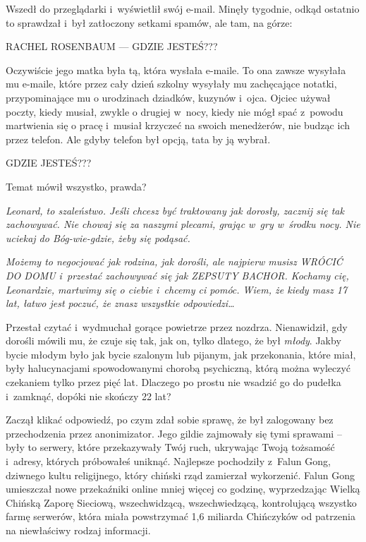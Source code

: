 \documentclass[oneside,polish,11pt,rmheadings]{mwbk}
\begin{document}
Wszedł do przeglądarki i~wyświetlił swój e-mail. Minęły tygodnie, odkąd ostatnio to sprawdzał i~był zatłoczony setkami spamów, ale tam, na górze: 


RACHEL ROSENBAUM --- GDZIE JESTEŚ??? 


Oczywiście jego matka była tą, która wysłała e-maile. To ona zawsze wysyłała mu e-maile, które przez cały dzień szkolny wysyłały mu zachęcające notatki, przypominające mu o urodzinach dziadków, kuzynów i~ojca. Ojciec używał poczty, kiedy musiał, zwykle o drugiej w~nocy, kiedy nie mógł spać z~powodu martwienia się o pracę i~musiał krzyczeć na swoich menedżerów, nie budząc ich przez telefon. Ale gdyby telefon był opcją, tata by ją wybrał. 


GDZIE JESTEŚ??? 


Temat mówił wszystko, prawda? 


\textit{Leonard, to szaleństwo. Jeśli chcesz być traktowany jak dorosły, zacznij się tak zachowywać. Nie chowaj się za naszymi plecami, grając w~gry w~środku nocy. Nie uciekaj do Bóg-wie-gdzie, żeby się podąsać.}


\textit{Możemy to negocjować jak rodzina, jak dorośli, ale najpierw musisz WRÓCIĆ DO DOMU i~przestać zachowywać się jak ZEPSUTY BACHOR. Kochamy cię, Leonardzie, martwimy się o ciebie i~chcemy ci pomóc. Wiem, że kiedy masz 17 lat, łatwo jest poczuć, że znasz wszystkie odpowiedzi\ldots} 


Przestał czytać i~wydmuchał gorące powietrze przez nozdrza. Nienawidził, gdy dorośli mówili mu, że czuje się tak, jak on, tylko dlatego, że był \textit{młody}. Jakby bycie młodym było jak bycie szalonym lub pijanym, jak przekonania, które miał, były halucynacjami spowodowanymi chorobą psychiczną, którą można wyleczyć czekaniem tylko przez pięć lat. Dlaczego po prostu nie wsadzić go do pudełka i~zamknąć, dopóki nie skończy 22 lat? 


Zaczął klikać odpowiedź, po czym zdał sobie sprawę, że był zalogowany bez przechodzenia przez anonimizator. Jego gildie zajmowały się tymi sprawami -- były to serwery, które przekazywały Twój ruch, ukrywając Twoją tożsamość i~adresy, których próbowałeś uniknąć. Najlepsze pochodziły z~Falun Gong, dziwnego kultu religijnego, który chiński rząd zamierzał wykorzenić. Falun Gong umieszczał nowe przekaźniki online mniej więcej co godzinę, wyprzedzając Wielką Chińską Zaporę Sieciową, wszechwidzącą, wszechwiedzącą, kontrolującą wszystko farmę serwerów, która miała powstrzymać 1,6 miliarda Chińczyków od patrzenia na niewłaściwy rodzaj informacji. 
\end{document}

